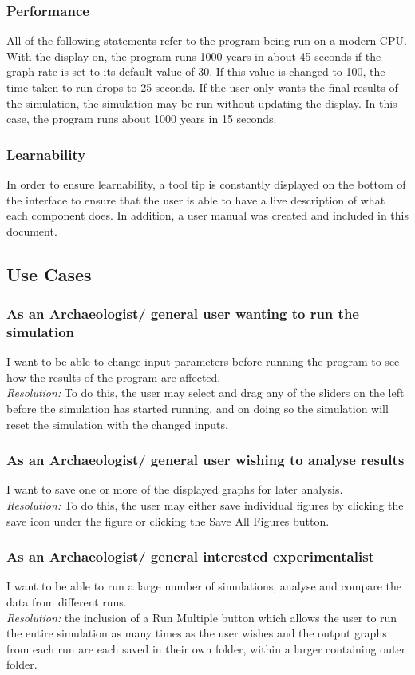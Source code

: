 \documentclass[12pt]{article}
\begin{document}
			\subsubsection{Performance}
				All of the following statements refer to the program being run on a modern CPU. With the display on, the program runs 1000 years in about 45 seconds if the graph rate is set to its default value of 30. If this value is changed to 100, the time taken to run drops to 25 seconds. If the user only wants the final results of the simulation, the simulation may be run without updating the display. In this case, the program runs about 1000 years in 15 seconds. 
			\subsubsection{Learnability}
				In order to ensure learnability, a tool tip is constantly displayed on the bottom of the interface to ensure that the user is able to have a live description of what each component does. In addition, a user manual was created and included in this document.
			
		\subsection{Use Cases}
			\subsubsection{As an Archaeologist/ general user wanting to run the simulation}
				I want to be able to change input parameters before running the program to see how the results of the program are affected.\\
				\textit{Resolution:} To do this, the user may select and drag any of the sliders on the left before the simulation has started running, and on doing so the simulation will reset the simulation with the changed inputs.
			\subsubsection{As an Archaeologist/ general user wishing to analyse results}
				I want to save one or more of the displayed graphs for later analysis.\\ \textit{Resolution:} To do this, the user may either save individual figures by clicking the save icon under the figure or clicking the Save All Figures button.
			\subsubsection{As an Archaeologist/ general interested experimentalist}
				I want to be able to run a large number of simulations, analyse and compare the data from different runs.\\
				\textit{Resolution:} the inclusion of a Run Multiple button which allows the user to run the entire simulation as many times as the user wishes and the output graphs from each run are each saved in their own folder, within a larger containing outer folder.
\end{document}
